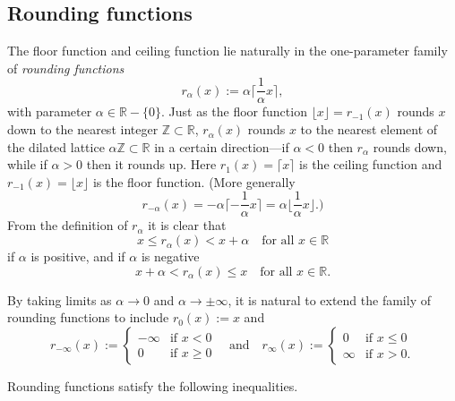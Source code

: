 \documentclass[12pt,letterpaper, reqno]{amsart}
\theoremstyle{definition}
\theoremstyle{remark}
\newtheorem{rmk}[thm]{Remark}
\newcommand{\RR}{\ensuremath{\mathbb{R}}}
\newcommand{\ZZ}{\ensuremath{\mathbb{Z}}}
\newcommand{\floor}[1]{\lfloor{#1}\rfloor}
\newcommand{\ceil}[1]{\lceil{#1}\rceil}
\newcommand{\bceil}[1]{\bigg\lceil{#1}\bigg\rceil}
\begin{document}
\subsection{Rounding functions}\label{sec:22}
The floor function and ceiling function lie naturally in the one-parameter family of {\em rounding functions} 
\begin{equation}
r_{\alpha}(x) := \alpha\bceil{\frac{1}{\alpha} x}, 
\end{equation}
 with parameter $\alpha\in\RR-\{0\}$. Just as the floor function $\floor{x}=r_{-1}(x)$ rounds $x$ down to the nearest integer $\ZZ\subset\RR$, $r_\alpha(x)$ rounds $x$ to the nearest element of the dilated lattice $\alpha\ZZ\subset\RR$ in a certain direction---if $\alpha<0$  then $r_\alpha$ rounds down, while if $\alpha >0$ then it  rounds up. Here $r_1(x) = \lceil x \rceil$
 is the ceiling function and $r_{-1}(x) = \floor{x}$ is the floor function. 
(More generally
 $$
 r_{- \alpha}(x) = -\alpha \ceil{- 
 \frac{1}{\alpha} x} = \alpha \floor{\frac{1}{\alpha}x}.)
 $$
From the definition of $r_\alpha$ it is clear that
\[ x \leq r_\alpha(x) < x + \alpha \quad\text{for all }x\in\RR\]
if $\alpha$ is positive, and if $\alpha$ is negative
\[ x+\alpha < r_\alpha(x) \leq x \quad\text{for all }x\in\RR.\]

By taking limits as $\alpha\to 0$ and $\alpha\to\pm\infty$, it is natural to extend the family of rounding functions to include $r_0(x) := x$ and 
\[r_{-\infty}(x) := \begin{cases}
-\infty & \text{if }x<0\\
0 & \text{if }x\geq 0\end{cases}
\quad\text{and}\quad
r_{\infty}(x) := \begin{cases}
0 & \text{if }x\leq 0\\
\infty & \text{if }x>0.\end{cases}\]

Rounding functions satisfy the following inequalities.
\end{document}

